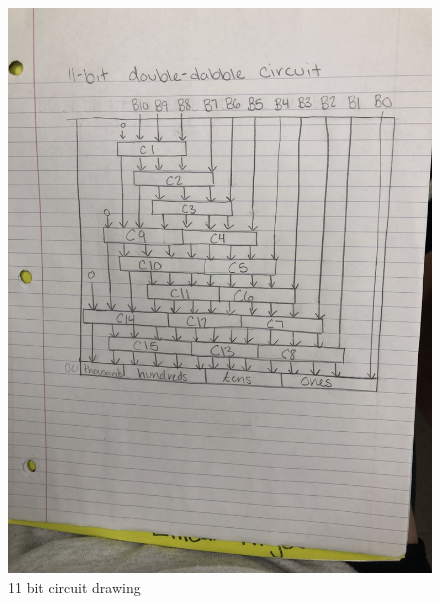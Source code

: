 \documentclass[11pt]{article}
\begin{document}
\begin{figure}
	\includegraphics[width= \textwidth]{11-bitcircuit.png}
	\caption{11 bit circuit drawing}\label{fig:11bitcircuit}
\end{figure}\\
\end{document}
